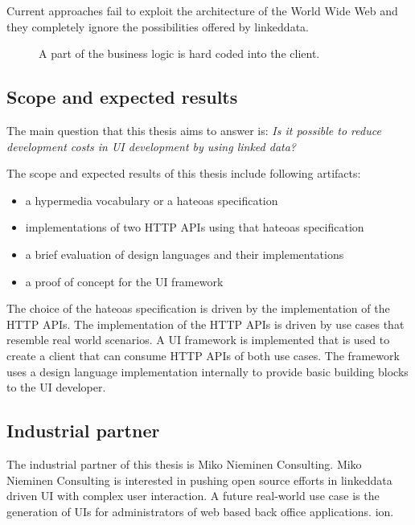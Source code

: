 Current approaches fail to exploit the architecture of the World Wide Web and they completely ignore the possibilities offered by \gls{linkeddata}.

\begin{figure}[!htb]
  \caption{A part of the business logic is hard coded into the client.}
  \label{fig:hardcoded}
\end{figure}

\subsection{Scope and expected results}
The main question that this thesis aims to answer is: \textit{Is it possible to reduce development costs in UI development by using linked data?}

The scope and expected results of this thesis include following artifacts:

\begin{itemize}
\item a \gls{hypermedia} vocabulary or a \gls{hateoas} specification
\item implementations of two HTTP APIs using that \gls{hateoas} specification
\item a brief evaluation of design languages and their implementations
\item a proof of concept for the UI framework
\end{itemize}

The choice of the \gls{hateoas} specification is driven by the implementation of the HTTP APIs. The implementation of the HTTP APIs is driven by use cases that resemble real world scenarios. A UI framework is implemented that is used to create a client that can consume HTTP APIs of both use cases. The framework uses a design language implementation internally to provide basic building blocks to the UI developer.

\subsection{Industrial partner}
The industrial partner of this thesis is Miko Nieminen Consulting. Miko Nieminen Consulting is interested in pushing open source efforts in \gls{linkeddata} driven UI with complex user interaction. A future real-world use case is the generation of UIs for administrators of web based back office applications.
ion.
